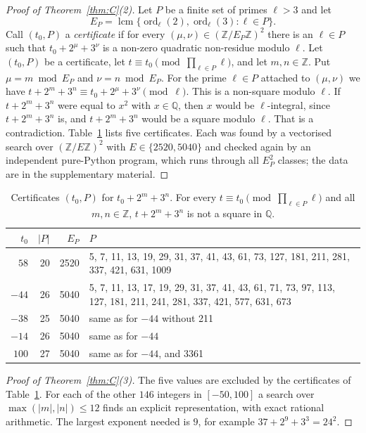 \documentclass[11pt]{amsart}
\theoremstyle{definition}
\theoremstyle{remark}
\newcommand{\Z}{\mathbb{Z}}
\newcommand{\Q}{\mathbb{Q}}
\DeclareMathOperator{\ord}{ord}
\DeclareMathOperator{\lcm}{lcm}
\begin{document}
\begin{proof}[Proof of Theorem~\ref{thm:C}(2)]
Let $P$ be a finite set of primes $\ell>3$ and let
\[
E_P=\lcm\{\ord_\ell(2),\ord_\ell(3):\ell\in P\}.
\]
Call $(t_0,P)$ a \emph{certificate} if for every $(\mu,\nu)\in(\Z/E_P\Z)^2$ there is an $\ell\in P$ such that $t_0+2^\mu+3^\nu$ is a non-zero quadratic non-residue modulo $\ell$.
Let $(t_0,P)$ be a certificate, let $t\equiv t_0\pmod{\prod_{\ell\in P}\ell}$, and let $m,n\in\Z$.
Put $\mu=m\bmod E_P$ and $\nu=n\bmod E_P$.
For the prime $\ell\in P$ attached to $(\mu,\nu)$ we have $t+2^m+3^n\equiv t_0+2^\mu+3^\nu\pmod\ell$.
This is a non-square modulo $\ell$.
If $t+2^m+3^n$ were equal to $x^2$ with $x\in\Q$, then $x$ would be $\ell$-integral, since $t+2^m+3^n$ is, and $t+2^m+3^n$ would be a square modulo $\ell$.
That is a contradiction.
Table~\ref{tab:certs} lists five certificates.
Each was found by a vectorised search over $(\Z/E\Z)^2$ with $E\in\{2520,5040\}$ and checked again by an independent pure-Python program, which runs through all $E_P^2$ classes; the data are in the supplementary material.
\end{proof}

\begin{table}[ht]
\centering
\caption{Certificates $(t_0,P)$ for $t_0+2^m+3^n$. For every $t\equiv t_0\pmod{\prod_{\ell\in P}\ell}$ and all $m,n\in\Z$, $t+2^m+3^n$ is not a square in $\Q$.}\label{tab:certs}
\small
\begin{tabular}{@{}rrrp{8.6cm}@{}}
\toprule
$t_0$ & $|P|$ & $E_P$ & $P$\\
\midrule
$58$ & 20 & 2520 & 5, 7, 11, 13, 19, 29, 31, 37, 41, 43, 61, 73, 127, 181, 211, 281, 337, 421, 631, 1009\\
$-44$ & 26 & 5040 & 5, 7, 11, 13, 17, 19, 29, 31, 37, 41, 43, 61, 71, 73, 97, 113, 127, 181, 211, 241, 281, 337, 421, 577, 631, 673\\
$-38$ & 25 & 5040 & same as for $-44$ without 211\\
$-14$ & 26 & 5040 & same as for $-44$\\
$100$ & 27 & 5040 & same as for $-44$, and 3361\\
\bottomrule
\end{tabular}
\end{table}

\begin{proof}[Proof of Theorem~\ref{thm:C}(3)]
The five values are excluded by the certificates of Table~\ref{tab:certs}.
For each of the other $146$ integers in $[-50,100]$ a search over $\max(|m|,|n|)\le12$ finds an explicit representation, with exact rational arithmetic.
The largest exponent needed is $9$, for example $37+2^9+3^3=24^2$.
\end{proof}
\end{document}
